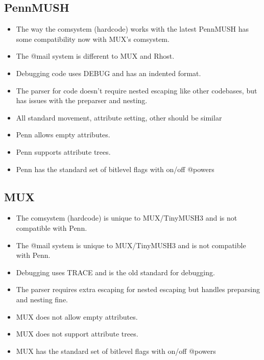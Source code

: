 \documentclass[letterpaper,10pt,english]{sphinxmanual}
\begin{document}
\subsection{PennMUSH}
\label{\detokenize{differences:pennmush}}\begin{itemize}
\item {} 
\sphinxAtStartPar
The way the comsystem (hardcode) works with the latest PennMUSH has some
compatibility now with MUX’s comsystem.

\item {} 
\sphinxAtStartPar
The @mail system is different to MUX and Rhost.

\item {} 
\sphinxAtStartPar
Debugging code uses DEBUG and has an indented format.

\item {} 
\sphinxAtStartPar
The parser for code doesn’t require nested escaping like other codebases, but has issues with the pre\sphinxhyphen{}parser and nesting.

\item {} 
\sphinxAtStartPar
All standard movement, attribute setting, other should be similar

\item {} 
\sphinxAtStartPar
Penn allows empty attributes.

\item {} 
\sphinxAtStartPar
Penn supports attribute trees.

\item {} 
\sphinxAtStartPar
Penn has the standard set of bitlevel flags with on/off @powers

\end{itemize}


\subsection{MUX}
\label{\detokenize{differences:mux}}\begin{itemize}
\item {} 
\sphinxAtStartPar
The comsystem (hardcode) is unique to MUX/TinyMUSH3 and is not compatible with Penn.

\item {} 
\sphinxAtStartPar
The @mail system is unique to MUX/TinyMUSH3 and is not compatible with Penn.

\item {} 
\sphinxAtStartPar
Debugging uses TRACE and is the old standard for debugging.

\item {} 
\sphinxAtStartPar
The parser requires extra escaping for nested escaping but handles pre\sphinxhyphen{}parsing and nesting fine.

\item {} 
\sphinxAtStartPar
MUX does not allow empty attributes.

\item {} 
\sphinxAtStartPar
MUX does not support attribute trees.

\item {} 
\sphinxAtStartPar
MUX has the standard set of bitlevel flags with on/off @powers

\end{itemize}
\end{document}
